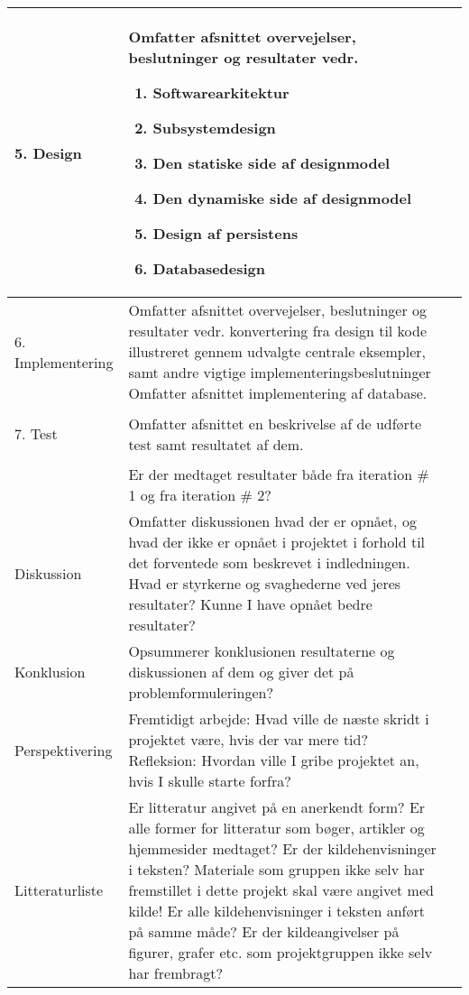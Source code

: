 \begin{center}
\begin{longtable}{|m{3.5cm}|m{10cm}|m{2.5cm}|}
\begin{flushright}
5. Design 
\end{flushright}
& Omfatter afsnittet overvejelser, beslutninger og resultater vedr. \newline
\begin{enumerate}
\item Softwarearkitektur
\item Subsystemdesign
\item Den statiske side af designmodel
\item Den dynamiske side af designmodel
\item Design af persistens
\item Databasedesign
\end{enumerate}
& \\ \hline
\begin{flushright}
6. Implementering
\end{flushright} 
& Omfatter afsnittet overvejelser, beslutninger og resultater vedr.  konvertering fra design til kode illustreret gennem udvalgte centrale eksempler, samt andre vigtige implementeringsbeslutninger\newline
Omfatter afsnittet implementering af database. & \\ 
\hline
\begin{flushright}
7. Test
\end{flushright}
& Omfatter afsnittet en beskrivelse af de udførte test samt resultatet af dem. & \\
\hline
& Er der medtaget resultater både fra iteration \# 1 og fra iteration \# 2? & \\ 
\hline
Diskussion &
Omfatter diskussionen hvad der er opnået, og hvad der ikke er opnået i projektet i forhold til det forventede som beskrevet i indledningen. \newline
Hvad er styrkerne og svaghederne ved jeres resultater? \newline
Kunne I have opnået bedre resultater?
& \\ \hline
Konklusion & Opsummerer konklusionen resultaterne og diskussionen af dem og giver det på problemformuleringen?  & \\
\hline
Perspektivering & 
Fremtidigt arbejde: Hvad ville de næste skridt i projektet være, hvis der var mere tid?\newline
Refleksion: Hvordan ville I gribe projektet an, hvis I skulle starte forfra? & \\
\hline
Litteraturliste & 
Er litteratur angivet på en anerkendt form? \newline
Er alle former for litteratur som bøger, artikler og hjemmesider medtaget? \newline
Er der kildehenvisninger i teksten? Materiale som gruppen ikke selv har fremstillet i dette projekt skal være angivet med kilde! \newline
Er alle kildehenvisninger i teksten anført på samme måde? \newline
Er der kildeangivelser på figurer, grafer etc. som projektgruppen ikke selv har frembragt? & \\
\hline
\end{longtable}
\end{center}


